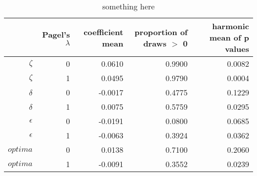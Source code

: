 \begin{table}[ht]
\centering
\begin{tabular}{rrrrr}
  \hline
 & Pagel's $\lambda$ & coefficient mean & proportion of draws $>$ 0 & harmonic mean of p values \\ 
  \hline
$\zeta $ &     0 & 0.0610 & 0.9900 & 0.0082 \\ 
  $\zeta$ &     1 & 0.0495 & 0.9790 & 0.0004 \\ 
  $\delta $ &     0 & -0.0017 & 0.4775 & 0.1229 \\ 
  $\delta$ &     1 & 0.0075 & 0.5759 & 0.0295 \\ 
  $\epsilon $ &     0 & -0.0191 & 0.0800 & 0.0685 \\ 
  $\epsilon$ &     1 & -0.0063 & 0.3924 & 0.0362 \\ 
  $optima $ &     0 & 0.0138 & 0.7100 & 0.2060 \\ 
  $optima$ &     1 & -0.0091 & 0.3552 & 0.0239 \\ 
   \hline
\end{tabular}
\caption{something here} 
\end{table}
